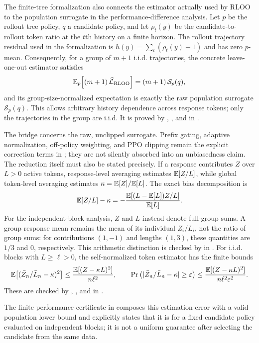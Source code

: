 The finite-tree formalization also connects the estimator actually used by RLOO to the population surrogate in the
performance-difference analysis. Let $p$ be the rollout tree policy, $q$ a candidate policy, and let
$\rho_t(y)$ be the candidate-to-rollout token ratio at the $t$th history on a finite horizon. The rollout trajectory
residual used in the formalization is $h(y)=\sum_t(\rho_t(y)-1)$ and has zero $p$-mean. Consequently, for a group of $m+1$ i.i.d. trajectories, the concrete leave-one-out
estimator satisfies
\begin{equation*}
    \mathbb{E}_p\!\left[(m+1)\,\widehat{\mathcal L}_{\rm RLOO}\right]
    =(m+1)\,\mathcal S_p(q),
\end{equation*}
and its group-size-normalized expectation is exactly the raw population surrogate $\mathcal S_p(q)$. This allows
arbitrary history dependence across response tokens; only the trajectories in the group are i.i.d. It is proved by
, , and
 in .

The bridge concerns the raw, unclipped surrogate. Prefix gating, adaptive normalization, off-policy weighting, and PPO
clipping remain the explicit correction terms in ; they are not silently absorbed into
an unbiasedness claim. The reduction itself must also be stated precisely. If a response contributes $Z$ over $L>0$ active
tokens, response-level averaging estimates $\mathbb{E}[Z/L]$, while global token-level averaging estimates
$\kappa=\mathbb{E}[Z]/\mathbb{E}[L]$. The exact bias decomposition is
\begin{equation*}
    \mathbb{E}[Z/L]-\kappa
    =-\frac{\mathbb{E}[(L-\mathbb{E}[L])Z/L]}{\mathbb{E}[L]}.
\end{equation*}
For the independent-block analysis, $Z$ and $L$ instead denote full-group
sums. A group response mean remains the mean of its individual $Z_i/L_i$,
not the ratio of group sums: for contributions $(1,-1)$ and lengths $(1,3)$,
these quantities are $1/3$ and $0$, respectively. This arithmetic distinction
is checked by  in
.
For i.i.d. blocks with $L\ge\ell>0$, the self-normalized token estimator has the finite bounds
\begin{equation*}
    \mathbb{E}\!\left[(\bar Z_n/\bar L_n-\kappa)^2\right]
    \le \frac{\mathbb{E}[(Z-\kappa L)^2]}{n\ell^2},
    \qquad
    \Pr\left(|\bar Z_n/\bar L_n-\kappa|\ge\varepsilon\right)
    \le \frac{\mathbb{E}[(Z-\kappa L)^2]}{n\ell^2\varepsilon^2}.
\end{equation*}
These are checked by ,
, and  in
.\par
The finite performance certificate in 
composes this estimation error with a valid population lower bound and
explicitly states that it is for a fixed candidate policy evaluated on
independent blocks; it is not a uniform guarantee after selecting the
candidate from the same data.

